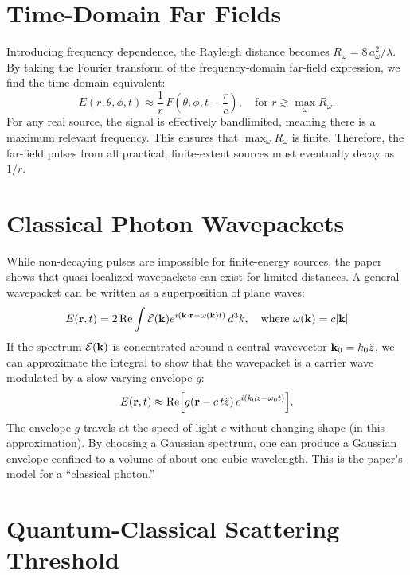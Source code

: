 \documentclass[11pt]{article}
\begin{document}
\section{Time-Domain Far Fields}

Introducing frequency dependence, the Rayleigh distance becomes $R_\omega=8\,a_\omega^2/\lambda$. By taking the Fourier transform of the frequency-domain far-field expression, we find the time-domain equivalent:
\[
E(r,\theta,\phi,t)\approx \frac{1}{r}\,F\left(\theta,\phi,t-\frac{r}{c}\right),
\quad \text{for } r\gtrsim \max_\omega R_\omega.
\]
For any real source, the signal is effectively bandlimited, meaning there is a maximum relevant frequency. This ensures that $\max_\omega R_\omega$ is finite. Therefore, the far-field pulses from all practical, finite-extent sources must eventually decay as $1/r$.

\section{Classical Photon Wavepackets}

While non-decaying pulses are impossible for finite-energy sources, the paper shows that quasi-localized wavepackets can exist for limited distances. A general wavepacket can be written as a superposition of plane waves:
\[
E(\vb r,t) = 2\Re\int \mathcal{E}(\vb k)e^{i(\vb k\cdot\vb r-\omega(\vb k)t)}\,d^3k, \quad \text{where }\omega(\vb k)=c|\vb k|
\]
If the spectrum $\mathcal{E}(\vb k)$ is concentrated around a central wavevector $\vb k_0=k_0\hat z$, we can approximate the integral to show that the wavepacket is a carrier wave modulated by a slow-varying envelope $g$:
\[
E(\vb r,t)\approx \Re\Bigl[g(\vb r-c\,t\hat z)\,e^{i(k_0z-\omega_0t)}\Bigr].
\]
The envelope $g$ travels at the speed of light $c$ without changing shape (in this approximation). By choosing a Gaussian spectrum, one can produce a Gaussian envelope confined to a volume of about one cubic wavelength. This is the paper's model for a ``classical photon.''

\section{Quantum-Classical Scattering Threshold}
\end{document}
